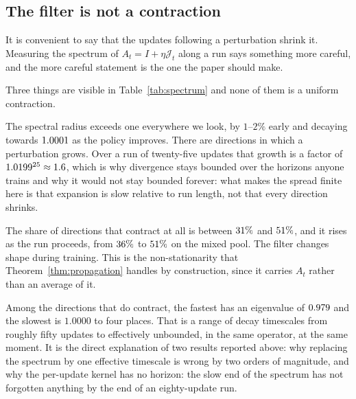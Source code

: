 \subsection{The filter is not a contraction}
\label{sec:exp-spectrum}

It is convenient to say that the updates following a perturbation shrink it. Measuring the spectrum
of $A_t = I + \eta\mathcal{J}_t$ along a run says something more careful, and the more careful
statement is the one the paper should make.

\begin{table}[t]
  \centering
  
  \caption{The spectrum of the transfer operator along a run of $600$ updates at $\eta = 1$,
  reported as $10^3(\rho - 1)$ for the spectral radius $\rho$. The operator expands in its leading
  direction throughout, and contracts in a minority of directions that grows as the run proceeds.}
  \label{tab:spectrum}
\end{table}

Three things are visible in Table~\ref{tab:spectrum} and none of them is a uniform contraction.

The spectral radius exceeds one everywhere we look, by $1$--$2\%$ early and decaying towards
$1.0001$ as the policy improves. There are directions in which a perturbation grows. Over a run of
twenty-five updates that growth is a factor of $1.0199^{25} \approx 1.6$, which is why divergence
stays bounded over the horizons anyone trains and why it would not stay bounded forever: what makes
the spread finite here is that expansion is slow relative to run length, not that every direction
shrinks.

The share of directions that contract at all is between $31\%$ and $51\%$, and it rises as the run
proceeds, from $36\%$ to $51\%$ on the mixed pool. The filter changes shape during training. This is
the non-stationarity that Theorem~\ref{thm:propagation} handles by construction, since it carries
$A_t$ rather than an average of it.

Among the directions that do contract, the fastest has an eigenvalue of
$0.979$ and the slowest is $1.0000$ to four places. That is a range of decay
timescales from roughly fifty updates to effectively unbounded, in the same operator, at the same moment. It is the direct explanation of two
results reported above: why replacing the spectrum by one effective timescale is wrong by two orders
of magnitude, and why the per-update kernel has no horizon: the slow end of the spectrum has not
forgotten anything by the end of an eighty-update run.

